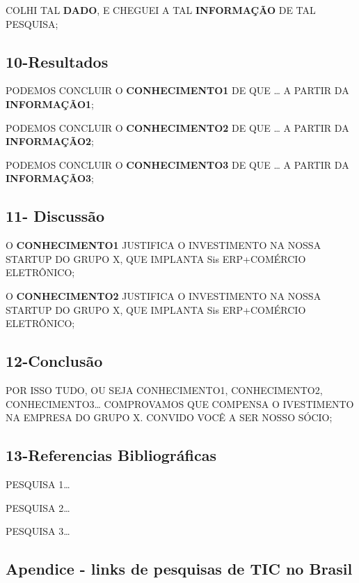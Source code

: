 \documentclass[
]{book}
\begin{document}
COLHI TAL \textbf{DADO}, E CHEGUEI A TAL \textbf{INFORMAÇÃO} DE TAL PESQUISA;

\subsection{10-Resultados}\label{resultados}

PODEMOS CONCLUIR O \textbf{CONHECIMENTO1} DE QUE \ldots{} A PARTIR DA \textbf{INFORMAÇÃO1};

PODEMOS CONCLUIR O \textbf{CONHECIMENTO2} DE QUE \ldots{} A PARTIR DA \textbf{INFORMAÇÃO2};

PODEMOS CONCLUIR O \textbf{CONHECIMENTO3} DE QUE \ldots{} A PARTIR DA \textbf{INFORMAÇÃO3};

\subsection{11- Discussão}\label{discussuxe3o}

O \textbf{CONHECIMENTO1} JUSTIFICA O INVESTIMENTO NA NOSSA STARTUP DO GRUPO X, QUE IMPLANTA Sis ERP+COMÉRCIO ELETRÔNICO;

O \textbf{CONHECIMENTO2} JUSTIFICA O INVESTIMENTO NA NOSSA STARTUP DO GRUPO X, QUE IMPLANTA Sis ERP+COMÉRCIO ELETRÔNICO;

\subsection{12-Conclusão}\label{conclusuxe3o}

POR ISSO TUDO, OU SEJA CONHECIMENTO1, CONHECIMENTO2, CONHECIMENTO3\ldots{} COMPROVAMOS QUE COMPENSA O IVESTIMENTO NA EMPRESA DO GRUPO X. CONVIDO VOCÊ A SER NOSSO SÓCIO;

\subsection{13-Referencias Bibliográficas}\label{referencias-bibliogruxe1ficas}

PESQUISA 1\ldots{}

PESQUISA 2\ldots{}

PESQUISA 3\ldots{}

\subsection{Apendice - links de pesquisas de TIC no Brasil}\label{apendice---links-de-pesquisas-de-tic-no-brasil}
\end{document}
